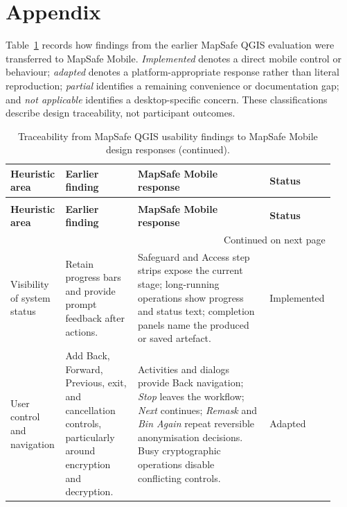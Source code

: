 \documentclass[a4paper,UKenglish,cleveref,autoref,thm-restate]{lipics-v2021}
\begin{document}
\section*{Appendix}

\noindent Table~\ref{tab:usability-traceability} records how findings from the earlier MapSafe QGIS evaluation were transferred to MapSafe Mobile. \emph{Implemented} denotes a direct mobile control or behaviour; \emph{adapted} denotes a platform-appropriate response rather than literal reproduction; \emph{partial} identifies a remaining convenience or documentation gap; and \emph{not applicable} identifies a desktop-specific concern. These classifications describe design traceability, not participant outcomes.

{\footnotesize
\setlength{\tabcolsep}{3pt}
\renewcommand{\arraystretch}{1.1}
\begin{longtable}{@{}p{0.16\linewidth}p{0.22\linewidth}p{0.40\linewidth}p{0.15\linewidth}@{}}
\caption{Traceability from MapSafe QGIS usability findings to MapSafe Mobile design responses.}
\label{tab:usability-traceability}\\
\toprule
\textbf{Heuristic area} & \textbf{Earlier finding} & \textbf{MapSafe Mobile response} & \textbf{Status} \\
\midrule
\endfirsthead
\caption[]{Traceability from MapSafe QGIS usability findings to MapSafe Mobile design responses (continued).}\\
\toprule
\textbf{Heuristic area} & \textbf{Earlier finding} & \textbf{MapSafe Mobile response} & \textbf{Status} \\
\midrule
\endhead
\midrule
\multicolumn{4}{r}{\scriptsize Continued on next page}\\
\endfoot
\bottomrule
\endlastfoot

Visibility of system status & Retain progress bars and provide prompt feedback after actions. & Safeguard and Access step strips expose the current stage; long-running operations show progress and status text; completion panels name the produced or saved artefact. & Implemented \\

User control and navigation & Add Back, Forward, Previous, exit, and cancellation controls, particularly around encryption and decryption. & Activities and dialogs provide Back navigation; \emph{Stop} leaves the workflow; \emph{Next} continues; \emph{Remask} and \emph{Bin Again} repeat reversible anonymisation decisions. Busy cryptographic operations disable conflicting controls. & Adapted \\


\end{longtable}}
\end{document}
